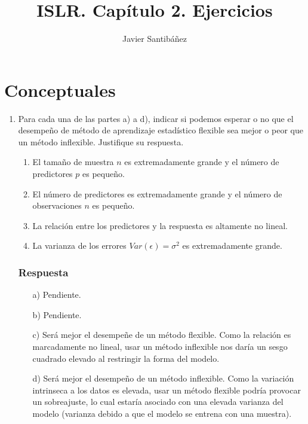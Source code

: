 \documentclass[11pt,letterpaper]{article}
\author{Javier Santibáñez}
\title{ISLR. Capítulo 2. Ejercicios}
\begin{document}
\maketitle
\thispagestyle{empty}

\section*{Conceptuales}

\begin{enumerate}

\item Para cada una de las partes a) a d), indicar si podemos esperar o no que el desempeño de método de aprendizaje estadístico flexible sea mejor o peor que un método inflexible. Justifique su respuesta.
\begin{enumerate}
	\item El tamaño de muestra $n$ es extremadamente grande y el número de predictores $p$ es pequeño.
	\item El número de predictores es extremadamente grande y el número de observaciones $n$ es pequeño.
	\item La relación entre los predictores y la respuesta es altamente no lineal.
	\item La varianza de los errores $Var(\epsilon)=\sigma^2$ es extremadamente grande.
\end{enumerate}

\subsubsection*{Respuesta}
\begin{enumerate}
	\item[a)] Pendiente.
	\item[b)] Pendiente.
	\item[c)] Será mejor el desempeñe de un método flexible. Como la relación es marcadamente no lineal, usar un método inflexible nos daría un sesgo cuadrado elevado al restringir la forma del modelo.
	\item[d)] Será mejor el desempeño de un método inflexible. Como la variación intrinseca a los datos es elevada, usar un método flexible podría provocar un sobreajuste, lo cual estaría asociado con una elevada varianza del modelo (varianza debido a que el modelo se entrena con una muestra).
\end{enumerate}



\end{enumerate}
\end{document}
